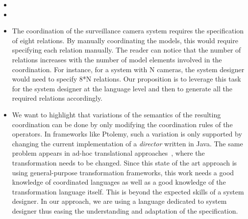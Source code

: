 \begin{itemize}
	\item {}
	\item {}
	\item The coordination of the surveillance camera system requires the specification of eight \ccsl relations. By manually coordinating the models, this would require specifying each relation manually. The reader can notice that the number of relations increases with the number of model elements involved in the coordination. For instance, for a system with N cameras, the system designer would need to specify 8*N relations. Our proposition is to leverage this task for the system designer at the language level and then to generate all the required relations accordingly.
	
	\item We want to highlight that variations of the semantics of the resulting coordination can be done by only modifying the coordination rules of the operators. In frameworks like Ptolemy, such a variation is only supported by changing the current implementation of a \emph{director} written in Java. The same problem appears in ad-hoc translational approaches~\cite{MarcoModels2014}, where the transformation needs to be changed. Since this state of the art approach is using general-purpose transformation frameworks, this work needs a good knowledge of coordinated languages as well as a good knowledge of the transformation language itself. This is beyond the expected skills of a system designer. In our approach, we are using a language dedicated to system designer thus easing the understanding and adaptation of the \bcool specification.
\end{itemize}